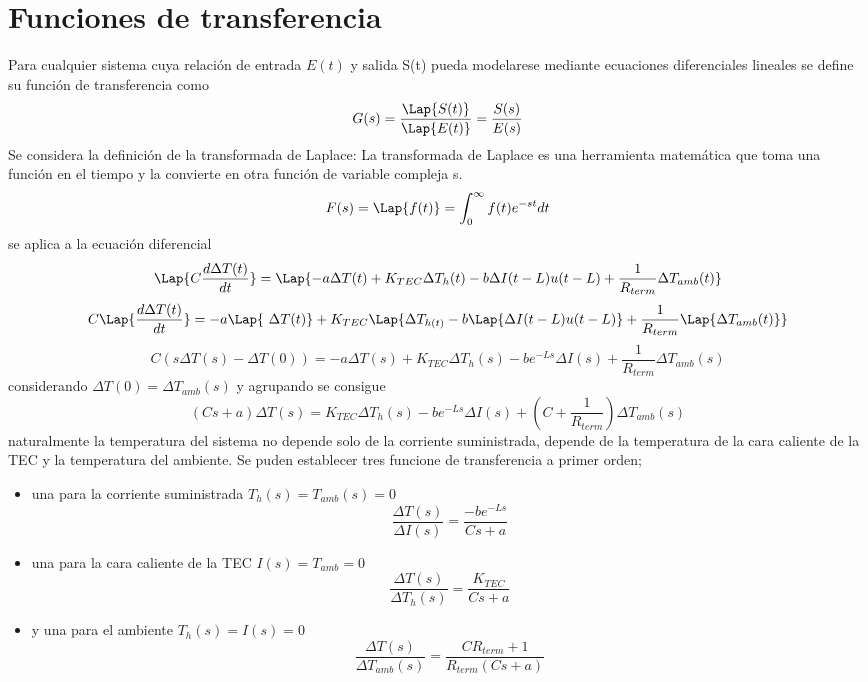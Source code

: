 \section{Funciones de transferencia}
Para cualquier sistema cuya relación de entrada $E(t)$ y salida S(t) pueda modelarese mediante  ecuaciones diferenciales lineales se define su función de transferencia como 
\begin{equation}
    G(s) = \frac{\Lap{S(t)}}{\Lap{E(t)}} = \frac{S(s)}{E(s)}
\end{equation}
Se considera la definición de la transformada de Laplace:
La transformada de Laplace es una herramienta matemática que toma una función en el tiempo y la convierte en otra función de variable compleja s.
\begin{equation}
    F(s)=\Lap {f(t)}=\int_{0}^{\infty}f(t)e^{-st}dt
\end{equation}
se aplica a la ecuación diferencial 
\begin{equation}
    \Lap{C\frac{d\Delta T(t)}{dt}} =\Lap{-a\Delta T (t) + K_{TEC}\Delta T_{h}(t) - b\Delta I(t-L)u(t-L)+ \frac{1 }{R_{term}}\Delta T_{amb}(t)}
\end{equation}
\begin{equation}
    C\Lap{\frac{d\Delta T(t)}{dt}} = -a\Lap{\ \Delta T (t)} + K_{TEC}\Lap{\Delta T_{h(t)} - b\Lap{\Delta I(t-L)u(t-L)}+ \frac{1 }{R_{term}}\Lap{\Delta T_{amb}(t)}}
\end{equation}
\begin{equation}
    C(s\Delta T(s)-\Delta T(0)) = -a\Delta T(s) + K_{TEC}\Delta T_{h}(s)-be^{-Ls}\Delta I(s) + \frac{1}{R_{term}}\Delta T_{amb}(s)
\end{equation}
considerando $\Delta T(0)=\Delta T_{amb}(s)$ y agrupando se consigue 
\begin{equation}
    (Cs+a)\Delta T(s) = K_{TEC}\Delta T_{h}(s)-be^{-Ls}\Delta I(s) + (C+\frac{1}{R_{term}})\Delta T_{amb}(s)
\end{equation}
naturalmente la temperatura del sistema no depende solo de la corriente suministrada, depende de la temperatura de la cara caliente de la TEC y la temperatura del ambiente. Se puden establecer tres funcione de transferencia a primer orden;
\begin{itemize}
    \item una para  la corriente suministrada $T_{h}(s) = T_{amb}(s) = 0$  
    \begin{equation}
        \frac{\Delta T(s)}{\Delta I(s)} = \frac{-be^{-Ls}}{Cs+a}
    \end{equation}
    \item una para la cara caliente de la TEC $I(s) = T_{amb} = 0$  
    \begin{equation}
        \frac{\Delta T(s)}{\Delta T_{h}(s)} = \frac{K_{TEC}}{Cs+a}
    \end{equation}
    \item y una para el ambiente $T_{h}(s) = I(s)=0$
    \begin{equation}
        \frac{\Delta T(s)}{\Delta T_{amb}(s)} = \frac{CR_{term}+1}{R_{term}(Cs+a)}
    \end{equation}
    \end{itemize}
